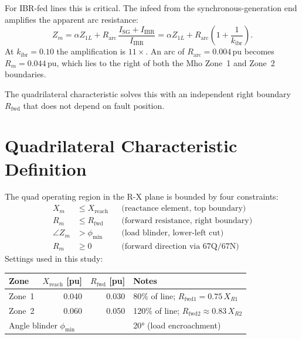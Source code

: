 \documentclass[11pt,a4paper]{article}
\begin{document}
For IBR-fed lines this is critical.  The infeed from the synchronous-generation
end amplifies the apparent arc resistance:
\begin{equation}
  Z_m = \alpha Z_{1L} + R_\mathrm{arc}\,\frac{I_\mathrm{SG} + I_\mathrm{IBR}}
        {I_\mathrm{IBR}}
      = \alpha Z_{1L} + R_\mathrm{arc}\!\left(1 + \frac{1}{k_\mathrm{ibr}}\right).
  \label{eq:infeed_zm}
\end{equation}
At $k_\mathrm{ibr}=0.10$ the amplification is $11\times$.  An arc of
$R_\mathrm{arc}=0.004$\,pu becomes $R_m=0.044$\,pu, which lies to the right of
both the Mho Zone~1 and Zone~2 boundaries.

The quadrilateral characteristic solves this with an independent right boundary
$R_\mathrm{fwd}$ that does not depend on fault position.

\section{Quadrilateral Characteristic Definition}
\label{sec:definition}

The quad operating region in the R-X plane is bounded by four constraints:
\begin{align}
  X_m       &\leq X_\mathrm{reach}   && \text{(reactance element, top boundary)}
  \label{eq:quad_x}\\
  R_m       &\leq R_\mathrm{fwd}     && \text{(forward resistance, right boundary)}
  \label{eq:quad_r}\\
  \angle Z_m &> \phi_\mathrm{min}    && \text{(load blinder, lower-left cut)}
  \label{eq:quad_phi}\\
  R_m       &\geq 0                  && \text{(forward direction via 67Q/67N)}
  \label{eq:quad_dir}
\end{align}
Settings used in this study:

\begin{center}
\begin{tabular}{@{}lrrl@{}}
\toprule
Zone & $X_\mathrm{reach}$ [pu] & $R_\mathrm{fwd}$ [pu] & Notes\\
\midrule
Zone~1 & 0.040 & 0.030 & 80\% of line; $R_\mathrm{fwd1}=0.75\,X_{R1}$\\
Zone~2 & 0.060 & 0.050 & 120\% of line; $R_\mathrm{fwd2}\approx 0.83\,X_{R2}$\\
\midrule
\multicolumn{3}{l}{Angle blinder $\phi_\mathrm{min}$} & 20° (load encroachment)\\
\bottomrule
\end{tabular}
\end{center}
\end{document}
